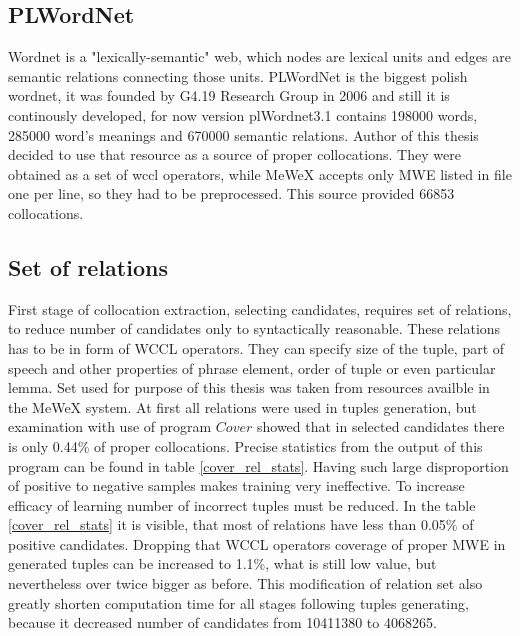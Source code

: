 \subsection{PLWordNet}
Wordnet is a "lexically-semantic" web, which nodes are lexical units and edges are semantic relations connecting those units.
PLWordNet is the biggest polish wordnet, it was founded by G4.19 Research Group in 2006 and still it is continously developed, 
for now version plWordnet3.1 contains 198000 words, 285000 word's meanings and 670000 semantic relations. Author of this thesis decided to use that resource 
as a source of proper collocations. They were obtained as a set of wccl operators, while MeWeX accepts only MWE listed in file one per line, 
so they had to be preprocessed. This source provided 66853 collocations.

\subsection{Set of relations}
First stage of collocation extraction, selecting candidates, requires set of relations, to reduce number of candidates only to syntactically reasonable. 
These relations has to be in form of WCCL operators. They can specify size of the tuple, part of speech and other properties of phrase element, 
order of tuple or even particular lemma. Set used for purpose of this thesis was taken from resources availble in the MeWeX system. 
At first all relations were used in tuples generation, but examination with use of program \(Cover\) showed that in selected candidates 
there is only 0.44\% of proper collocations. Precise statistics from the output of this program can be found in table \ref{cover_rel_stats}.
Having such large disproportion of positive to negative samples makes training very ineffective. To increase efficacy of learning 
number of incorrect tuples must be reduced. In the table \ref{cover_rel_stats} it is visible, that most of relations have less than 0.05\% 
of positive candidates. Dropping that WCCL operators coverage of proper MWE in generated tuples can be increased to 1.1\%, 
what is still low value, but nevertheless over twice bigger as before. This modification of relation set also greatly shorten computation time 
for all stages following tuples generating, because it decreased number of candidates from 10411380 to 4068265.

